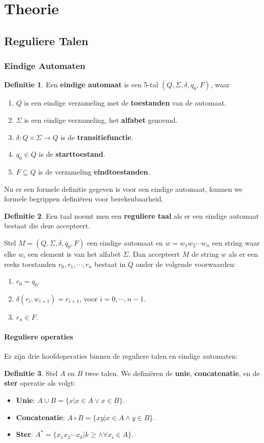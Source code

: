 \documentclass[12pt,a4paper]{article}
\theoremstyle{definition}
\newtheorem{defi}{Definitie}[section]
\newcommand{\ra}{\ensuremath{\rightarrow}}
\newcommand{\NFA}{\ensuremath{(Q,\Sigma,\delta,q_0,F)}}
\begin{document}
\section{Theorie}
\subsection{Reguliere Talen}
\subsubsection{Eindige Automaten}
	\begin{defi}
		Een \textbf{eindige automaat} is een 5-tal $(Q,\Sigma,\delta,q_0,F)$, waar
		\begin{enumerate}
			\item $Q$ is een eindige verzameling met de \textbf{toestanden} van de automaat.
			\item $\Sigma$ is een eindige verzameling, het \textbf{alfabet} genoemd.
			\item $\delta: Q\times \Sigma \ra Q$ is de \textbf{transitiefunctie}.
			\item $q_0 \in Q$ is de \textbf{starttoestand}.
			\item $F \subseteq Q$ is de verzameling \textbf{eindtoestanden}.			
		\end{enumerate}
	\end{defi}
Nu er een formele definitie gegeven is voor een eindige automaat, kunnen we formele begrippen definiëren voor berekenbaarheid.\\
	
	\begin{defi}
		Een taal noemt men een \textbf{reguliere taal} als er een eindige automaat bestaat die deze accepteert.
	\end{defi}
	Stel $M = \NFA$ een eindige automaat en $w=w_1w_2\cdots w_n$ een string waar elke $w_i$ een element is van het alfabet $\Sigma$. Dan accepteert $M$ de string $w$ als er een reeks toestanden $r_0,r_1,\cdots,r_n$ bestaat in $Q$ onder de volgende voorwaarden:
	\begin{enumerate}
		\item $r_0 = q_0$.
		\item $\delta(r_i,w_{i+1})=r_{i+1}$, voor $i=0,\cdots,n-1$.
		\item $r_n \in F$.
	\end{enumerate} 
	\paragraph{Reguliere operaties}
	Er zijn drie hoofdoperaties binnen de reguliere talen en eindige automaten:
	\begin{defi}
		Stel $A$ en $B$ twee talen. We definiëren de \textbf{unie}, \textbf{concatenatie}, en de \textbf{ster} operatie als volgt:
		\begin{itemize}
			\item \textbf{Unie}: $A\cup B=\{x|x\in A \vee x\in B\}$.
			\item \textbf{Concatenatie}: $A\circ B = \{xy|x\in A \wedge y \in B\}$.
			\item \textbf{Ster}: $A^*=\{x_1 x_2\cdots x_k | k\geq \wedge \forall x_i\in A\}$.
		\end{itemize}
	\end{defi}
\end{document}

